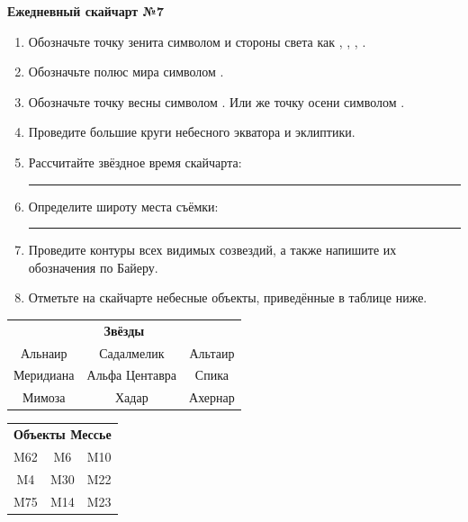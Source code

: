 \documentclass{./SAS-class-skygen}
\begin{document}
    
    
    
	\begin{center}
		\large\textbf{Ежедневный скайчарт №7}
	\end{center}

	\begin{enumerate}
		\item Обозначьте точку зенита символом  и стороны света как , , , .
		\item Обозначьте полюс мира символом .
		\item Обозначьте точку весны символом \Aries. Или же точку осени символом \Libra.
		\item Проведите большие круги небесного экватора и эклиптики.
		\item Рассчитайте звёздное время скайчарта: \rule{2cm}{0.4pt}
		\item Определите широту места съёмки: \rule{2cm}{0.4pt}
		\item Проведите контуры всех видимых созвездий, а также напишите их обозначения по Байеру.
		\item Отметьте на скайчарте небесные объекты, приведённые в таблице ниже.
	\end{enumerate}
	
    \vspace{0.5cm}

    \begin{table}[h!]
    \centering
    \begin{tabular}{ccc}
    \multicolumn{3}{c}{\textbf{Звёзды}} \\ Альнаир & Садалмелик & Альтаир \\
Меридиана & Альфа Центавра & Спика \\
Мимоза & Хадар & Ахернар \\

\end{tabular}
    \hfill
    \begin{tabular}{ccc}
    \multicolumn{3}{c}{\textbf{Объекты Мессье}} \\ M62 & M6 & M10 \\
M4 & M30 & M22 \\
M75 & M14 & M23 \\

\end{tabular}
    \end{table}
	
\end{document}
